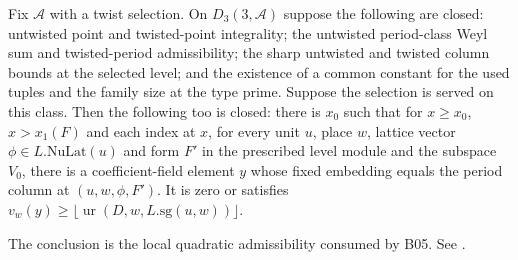 
\begin{formalstatement}\label{sub:B06}
Fix $\mathcal A$ with a twist selection. On $D_3(3,\mathcal A)$ suppose
the following are closed: untwisted point and twisted-point integrality;
the untwisted period-class Weyl sum and twisted-period admissibility;
the sharp untwisted and twisted column bounds at the selected level;
and the existence of a common constant for the used tuples and the
family size at the type prime. Suppose the selection is served on this
class. Then the following too is closed: there is $x_0$ such that
for $x\ge x_0$, $x>x_1(F)$ and each index at $x$, for every unit $u$,
place $w$, lattice vector $\phi\in L.\mathrm{NuLat}(u)$ and form
$F'$ in the prescribed level module and the subspace $V_0$, there is
a coefficient-field element $y$ whose fixed embedding equals the period
column at $(u,w,\phi,F')$. It is zero or satisfies
$v_w(y)\ge\lfloor\operatorname{ur}(D,w,L.\mathrm{sg}(u,w))\rfloor$.
\end{formalstatement}
The conclusion is the local quadratic admissibility consumed by B05.
See .

